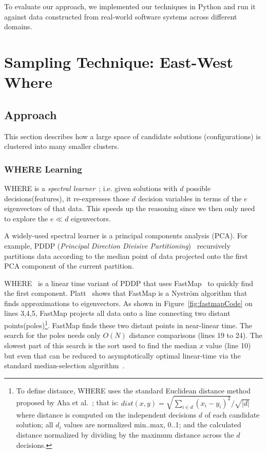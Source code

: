 \documentclass{sig-alternative}
\newcommand{\fig}[1]{Figure~\ref{fig:#1}}
\begin{document}
To evaluate our approach, we  implemented our techniques in Python and run it against data constructed from real-world software systems across different domains. 

\section{Sampling Technique: East-West Where}
\subsection{Approach}
This section describes how a large space of candidate solutions (configurations) is clustered into many smaller clusters.
\subsubsection{WHERE Learning}\label{sec:spectral}


WHERE is a {\em spectral learner}~\cite{kamvar2003spectral}; i.e. given solutions with $d$ possible decisions(features), it re-expresses those $d$ decision variables in terms of the $e$ eigenvectors of that data.
This speeds up the reasoning since we then only need to explore the $e\ll d$   eigenvectors.

A widely-used spectral learner is a principal components analysis (PCA). For example, PDDP ({\em Principal Direction Divisive Partitioning})~\cite{boley1998principal} recursively partitions data according to the median point of data projected onto the first PCA component of the current partition.

WHERE~\cite{me12d} is a linear time variant of PDDP  
that uses FastMap~\cite{Faloutsos1995} to quickly find the first component.
Platt~\cite{platt05} shows that FastMap is a  Nystr\"om algorithm that finds approximations to eigenvectors.
As shown in \fig{fastmapCode} on lines 3,4,5, FastMap  projects all data onto a line connecting two distant points(poles)\footnote{
To define distance, WHERE uses the standard Euclidean distance method proposed by Aha et al.~\cite{aha91}; that is: $dist(x,y)= \sqrt{\sum_{i\in d} (x_i - y_i)^2}/\sqrt{ \left\vert{d}\right\vert }$ where distance is computed on the independent decisions $d$ of each candidate solution; all $d_i$ values are normalized min..max, 0..1; and the calculated distance normalized by dividing by the maximum distance across the $d$ decisions.}. 
FastMap finds these two distant points in near-linear time. 
The search for the poles needs only $O(N)$ distance comparisons (lines 19 to 24).
The slowest part of this search is the sort used to find the median $x$ value (line 10) but even that can be reduced to  asymptotically optimal linear-time via the standard median-selection algorithm~\cite{hoare61}.
\end{document}
